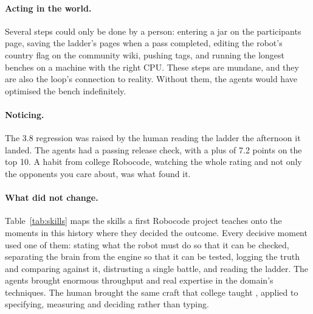 \documentclass[10pt,twocolumn]{article}
\begin{document}
\paragraph{Acting in the world.} Several steps could only be done by a person: entering a jar on
the participants page, saving the ladder's pages when a pass completed, editing the robot's country
flag on the community wiki, pushing tags, and running the longest benches on a machine with the
right CPU. These steps are mundane, and they are also the loop's connection to reality. Without
them, the agents would have optimised the bench indefinitely.

\paragraph{Noticing.} The 3.8 regression was raised by the human reading the ladder the afternoon it
landed. The agents had a passing release check, with a plus of 7.2 points on the top 10. A habit
from college Robocode, watching the whole rating and not only the opponents you care about, was
what found it.

\paragraph{What did not change.} Table~\ref{tab:skills} maps the skills a first Robocode project
teaches onto the moments in this history where they decided the outcome. Every decisive moment used
one of them: stating what the robot must do so that it can be
checked, separating the brain from the engine so that it can be tested, logging the truth and
comparing against it, distrusting a single battle, and reading the ladder. The agents brought
enormous throughput and real expertise in the domain's techniques. The human brought the same
craft that college taught \cite{mcbreen2001,hunt1999}, applied to specifying, measuring and
deciding rather than typing.
\end{document}
